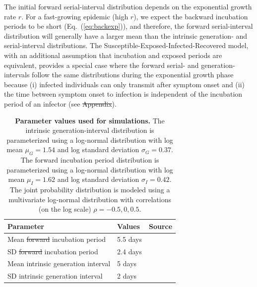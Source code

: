 \documentclass[12pt]{article}
\newcommand{\eref}[1]{Eq.~(\ref{eq:#1})} %
\providecommand{\DIFaddtex}[1]{{\protect\color{blue}\uwave{#1}}} %
\providecommand{\DIFdeltex}[1]{{\protect\color{red}\sout{#1}}}                      %
\providecommand{\DIFaddbegin}{} %
\providecommand{\DIFaddend}{} %
\providecommand{\DIFdelbegin}{} %
\providecommand{\DIFdelend}{} %
\providecommand{\DIFaddFL}[1]{\DIFadd{#1}} %
\providecommand{\DIFdelFL}[1]{\DIFdel{#1}} %
\providecommand{\DIFaddbeginFL}{} %
\providecommand{\DIFaddendFL}{} %
\providecommand{\DIFdelbeginFL}{} %
\providecommand{\DIFdelendFL}{} %
\providecommand{\DIFadd}[1]{\texorpdfstring{\DIFaddtex{#1}}{#1}} %
\providecommand{\DIFdel}[1]{\texorpdfstring{\DIFdeltex{#1}}{}} %
\newcommand{\DIFscaledelfig}{0.5}
\newlength{\DIFdelgraphicswidth} %
\newlength{\DIFdelgraphicsheight} %
\newcommand{\DIFaddincludegraphics}[2][]{{\color{blue}\fbox{\DIFOincludegraphics[#1]{#2}}}} %
\newcommand{\DIFdelincludegraphics}[2][]{%
\sbox{\DIFdelgraphicsbox}{\DIFOincludegraphics[#1]{#2}}%
\settoboxwidth{\DIFdelgraphicswidth}{\DIFdelgraphicsbox} %
\settoboxtotalheight{\DIFdelgraphicsheight}{\DIFdelgraphicsbox} %
\scalebox{\DIFscaledelfig}{%
\parbox[b]{\DIFdelgraphicswidth}{\usebox{\DIFdelgraphicsbox}\\[-\baselineskip] \rule{\DIFdelgraphicswidth}{0em}}\llap{\resizebox{\DIFdelgraphicswidth}{\DIFdelgraphicsheight}{%
\setlength{\unitlength}{\DIFdelgraphicswidth}%
\begin{picture}(1,1)%
\thicklines\linethickness{2pt} %
{\color[rgb]{1,0,0}\put(0,0){\framebox(1,1){}}}%
{\color[rgb]{1,0,0}\put(0,0){\line( 1,1){1}}}%
{\color[rgb]{1,0,0}\put(0,1){\line(1,-1){1}}}%
\end{picture}%
}\hspace*{3pt}}} %
} %
\DeclareRobustCommand{\DIFaddbegin}{\DIFOaddbegin \let\includegraphics\DIFaddincludegraphics} %
\DeclareRobustCommand{\DIFaddend}{\DIFOaddend \let\includegraphics\DIFOincludegraphics} %
\DeclareRobustCommand{\DIFdelbegin}{\DIFOdelbegin \let\includegraphics\DIFdelincludegraphics} %
\DeclareRobustCommand{\DIFdelend}{\DIFOaddend \let\includegraphics\DIFOincludegraphics} %
\DeclareRobustCommand{\DIFaddbeginFL}{\DIFOaddbeginFL \let\includegraphics\DIFaddincludegraphics} %
\DeclareRobustCommand{\DIFaddendFL}{\DIFOaddendFL \let\includegraphics\DIFOincludegraphics} %
\DeclareRobustCommand{\DIFdelbeginFL}{\DIFOdelbeginFL \let\includegraphics\DIFdelincludegraphics} %
\DeclareRobustCommand{\DIFdelendFL}{\DIFOaddendFL \let\includegraphics\DIFOincludegraphics} %
\begin{document}
The initial forward serial-interval distribution depends on the exponential growth rate $r$.
For a fast-growing epidemic (high $r$), we expect the backward incubation periods to be short (\eref{backexp}), and therefore, the forward serial-interval distribution will generally have a larger mean than the intrinsic generation- and serial-interval distributions.
The Susceptible-Exposed-Infected-Recovered model, with an additional assumption that incubation and exposed periods are equivalent, provides a special case where the forward serial- and generation-intervals follow the same distributions during the exponential growth phase because (i) infected individuals can only transmit after symptom onset and (ii) the time between symptom onset to infection is independent of the incubation period of an infector (see \DIFdelbegin \DIFdel{Appendix}\DIFdelend \DIFaddbegin \DIFadd{Supplementary Materials}\DIFaddend ).

\begin{table}[!th]
\begin{center}
\begin{tabular}{|l|l|r|}
\hline
Parameter & Values & Source\\
\hline
Mean \DIFdelbeginFL \DIFdelFL{forward }\DIFdelendFL \DIFaddbeginFL \DIFaddFL{intrinsic }\DIFaddendFL incubation period & 5.5 days & \cite{lauer2020incubation} \\
SD \DIFdelbeginFL \DIFdelFL{forward }\DIFdelendFL \DIFaddbeginFL \DIFaddFL{intrinsic }\DIFaddendFL incubation period & 2.4 days & \cite{lauer2020incubation} \\
Mean intrinsic generation interval & 5 days & \cite{ferretti2020quantifying} \\
SD intrinsic generation interval & 2 days & \cite{ferretti2020quantifying} \\
\hline
\end{tabular}
\end{center}
\caption{
\textbf{Parameter values used for simulations.}
The intrinsic generation-interval distribution is parameterized using a log-normal distribution with log mean $\mu_G=1.54$ and log standard deviation $\sigma_G=0.37$.
The forward incubation period distribution is parameterized using a log-normal distribution with log mean $\mu_I=1.62$ and log standard deviation $\sigma_I=0.42$.
The joint probability distribution is modeled using a multivariate log-normal distribution with correlations (on the log scale) $\rho=-0.5, 0, 0.5$.
}
\end{table}
\end{document}
